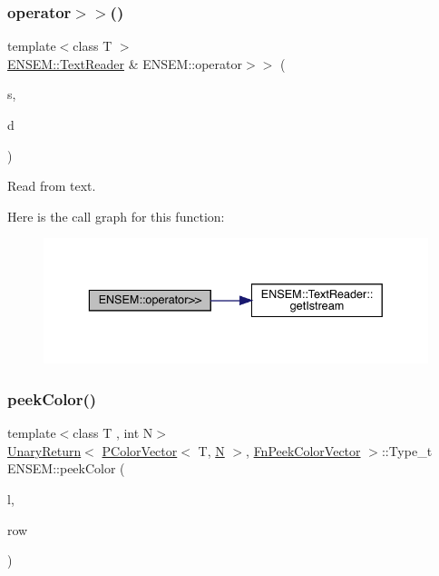 \subsubsection{\texorpdfstring{operator$>$$>$()}{operator>>()}\hspace{0.1cm}{\footnotesize\ttfamily [7/7]}}
{\footnotesize\ttfamily template$<$class T $>$ \\
\mbox{\hyperlink{classENSEM_1_1TextReader}{E\+N\+S\+E\+M\+::\+Text\+Reader}} \& E\+N\+S\+E\+M\+::operator$>$$>$ (\begin{DoxyParamCaption}\item[{\mbox{\hyperlink{classENSEM_1_1TextReader}{E\+N\+S\+E\+M\+::\+Text\+Reader}} \&}]{s,  }\item[{\mbox{\hyperlink{classENSEM_1_1Ensem}{Ensem}}$<$ \mbox{\hyperlink{classENSEM_1_1OTensor}{O\+Tensor}}$<$ T $>$ $>$ \&}]{d }\end{DoxyParamCaption})\hspace{0.3cm}{\ttfamily [inline]}}



Read from text. 

Here is the call graph for this function\+:\nopagebreak
\begin{figure}[H]
\begin{center}
\leavevmode
\includegraphics[width=336pt]{d2/d94/namespaceENSEM_a0fb9e35cf8c1d41d42dd10cefcf7cbe5_cgraph}
\end{center}
\end{figure}
\mbox{\label{namespaceENSEM_a795563dd1752d6dee39fee8212b66d34}} 
\subsubsection{\texorpdfstring{peekColor()}{peekColor()}}
{\footnotesize\ttfamily template$<$class T , int N$>$ \\
\mbox{\hyperlink{structENSEM_1_1UnaryReturn}{Unary\+Return}}$<$ \mbox{\hyperlink{classENSEM_1_1PColorVector}{P\+Color\+Vector}}$<$ T, \mbox{\hyperlink{operator__name__util_8cc_a7722c8ecbb62d99aee7ce68b1752f337}{N}} $>$, \mbox{\hyperlink{structENSEM_1_1FnPeekColorVector}{Fn\+Peek\+Color\+Vector}} $>$\+::Type\+\_\+t E\+N\+S\+E\+M\+::peek\+Color (\begin{DoxyParamCaption}\item[{const \mbox{\hyperlink{classENSEM_1_1PColorVector}{P\+Color\+Vector}}$<$ T, \mbox{\hyperlink{operator__name__util_8cc_a7722c8ecbb62d99aee7ce68b1752f337}{N}} $>$ \&}]{l,  }\item[{int}]{row }\end{DoxyParamCaption})\hspace{0.3cm}{\ttfamily [inline]}}

